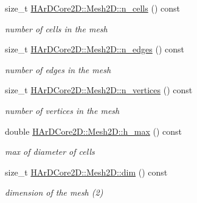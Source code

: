 \begin{DoxyCompactItemize}
\mbox{\label{group__Mesh2D_ga49d8009eeb74fd880ef9bb61c37fa672}} 
size\+\_\+t \hyperlink{group__Mesh2D_ga49d8009eeb74fd880ef9bb61c37fa672}{H\+Ar\+D\+Core2\+D\+::\+Mesh2\+D\+::n\+\_\+cells} () const
\begin{DoxyCompactList}\small\item\em number of cells in the mesh \end{DoxyCompactList}\item 
\mbox{\label{group__Mesh2D_ga28758c0eb5e8ce4e0b43c35071a924ef}} 
size\+\_\+t \hyperlink{group__Mesh2D_ga28758c0eb5e8ce4e0b43c35071a924ef}{H\+Ar\+D\+Core2\+D\+::\+Mesh2\+D\+::n\+\_\+edges} () const
\begin{DoxyCompactList}\small\item\em number of edges in the mesh \end{DoxyCompactList}\item 
\mbox{\label{group__Mesh2D_ga3b1e13201d9d23cd835509cc36d28b64}} 
size\+\_\+t \hyperlink{group__Mesh2D_ga3b1e13201d9d23cd835509cc36d28b64}{H\+Ar\+D\+Core2\+D\+::\+Mesh2\+D\+::n\+\_\+vertices} () const
\begin{DoxyCompactList}\small\item\em number of vertices in the mesh \end{DoxyCompactList}\item 
\mbox{\label{group__Mesh2D_gaaaa058631dc2af282237e489c5861b8b}} 
double \hyperlink{group__Mesh2D_gaaaa058631dc2af282237e489c5861b8b}{H\+Ar\+D\+Core2\+D\+::\+Mesh2\+D\+::h\+\_\+max} () const
\begin{DoxyCompactList}\small\item\em max of diameter of cells \end{DoxyCompactList}\item 
\mbox{\label{group__Mesh2D_ga0f0a5c852edbfcbf66fc84a2005fdaf2}} 
size\+\_\+t \hyperlink{group__Mesh2D_ga0f0a5c852edbfcbf66fc84a2005fdaf2}{H\+Ar\+D\+Core2\+D\+::\+Mesh2\+D\+::dim} () const
\begin{DoxyCompactList}\small\item\em dimension of the mesh (2) \end{DoxyCompactList}\item 
\mbox{\label{group__Mesh2D_ga6feb79c0ef575bf4b4b90854dcda8646}} 

\end{DoxyCompactItemize}
